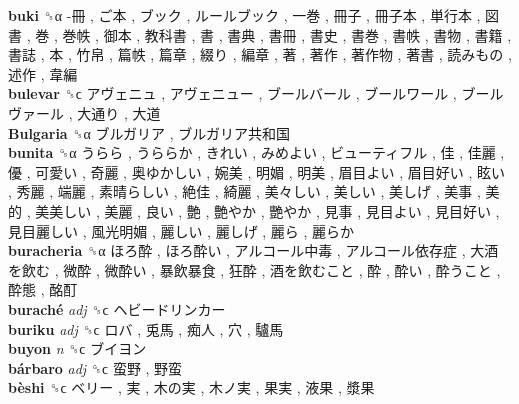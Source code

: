 \textbf{buki} ␝α   -冊 ,  ご本 ,  ブック ,  ルールブック ,  一巻 ,  冊子 ,  冊子本 ,  単行本 ,  図書 ,  巻 ,  巻帙 ,  御本 ,  教科書 ,  書 ,  書典 ,  書冊 ,  書史 ,  書巻 ,  書帙 ,  書物 ,  書籍 ,  書誌 ,  本 ,  竹帛 ,  篇帙 ,  篇章 ,  綴り ,  編章 ,  著 ,  著作 ,  著作物 ,  著書 ,  読みもの ,  述作 ,  韋編   \\
\textbf{bulevar} ␝ϲ   アヴェニュ ,  アヴェニュー ,  ブールバール ,  ブールワール ,  ブールヴァール ,  大通り ,  大道   \\
\textbf{Bulgaria} ␝α   ブルガリア ,  ブルガリア共和国   \\
\textbf{bunita} ␝α   うらら ,  うららか ,  きれい ,  みめよい ,  ビューティフル ,  佳 ,  佳麗 ,  優 ,  可愛い ,  奇麗 ,  奥ゆかしい ,  婉美 ,  明媚 ,  明美 ,  眉目よい ,  眉目好い ,  眩い ,  秀麗 ,  端麗 ,  素晴らしい ,  絶佳 ,  綺麗 ,  美々しい ,  美しい ,  美しげ ,  美事 ,  美的 ,  美美しい ,  美麗 ,  良い ,  艶 ,  艶やか ,  艷やか ,  見事 ,  見目よい ,  見目好い ,  見目麗しい ,  風光明媚 ,  麗しい ,  麗しげ ,  麗ら ,  麗らか   \\
\textbf{buracheria} ␝α   ほろ酔 ,  ほろ酔い ,  アルコール中毒 ,  アルコール依存症 ,  大酒を飲む ,  微酔 ,  微酔い ,  暴飲暴食 ,  狂酔 ,  酒を飲むこと ,  酔 ,  酔い ,  酔うこと ,  酔態 ,  酩酊   \\
\textbf{buraché} \emph{adj}  ␝ϲ   ヘビードリンカー   \\
\textbf{buriku} \emph{adj}  ␝ϲ   ロバ ,  兎馬 ,  痴人 ,  穴 ,  驢馬   \\
\textbf{buyon} \emph{n}  ␝ϲ   ブイヨン   \\
\textbf{bárbaro} \emph{adj}  ␝ϲ   蛮野 ,  野蛮   \\
\textbf{bèshi} ␝ϲ   ベリー ,  実 ,  木の実 ,  木ノ実 ,  果実 ,  液果 ,  漿果   \\

